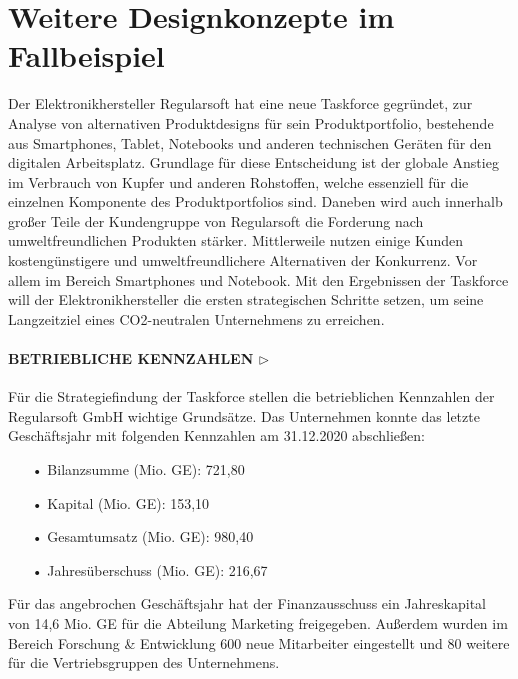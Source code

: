 \documentclass[12pt,titlepage]{article}
\begin{document}
\section*{Weitere Designkonzepte im Fallbeispiel} 
Der Elektronikhersteller Regularsoft hat eine neue Taskforce gegründet, zur Analyse von alternativen Produktdesigns für sein Produktportfolio, bestehende aus Smartphones, Tablet, Notebooks und anderen technischen Geräten für den digitalen Arbeitsplatz. Grundlage für diese Entscheidung ist der globale Anstieg im Verbrauch von Kupfer und anderen Rohstoffen, welche essenziell für die einzelnen Komponente des Produktportfolios sind. Daneben wird auch innerhalb großer Teile der Kundengruppe von Regularsoft die Forderung nach umweltfreundlichen Produkten stärker. Mittlerweile nutzen einige Kunden kostengünstigere und umweltfreundlichere Alternativen der Konkurrenz. Vor allem im Bereich Smartphones und Notebook.
Mit den Ergebnissen der Taskforce will der Elektronikhersteller die ersten strategischen Schritte setzen, um seine Langzeitziel eines CO2-neutralen Unternehmens zu erreichen.


\paragraph{\textbf{BETRIEBLICHE KENNZAHLEN $\triangleright$}}
Für die Strategiefindung der Taskforce stellen die betrieblichen Kennzahlen der Regularsoft GmbH wichtige Grundsätze. Das Unternehmen konnte das letzte Geschäftsjahr mit folgenden Kennzahlen am 31.12.2020 abschließen:
\begin{itemize}
\item[•] Bilanzsumme (Mio. GE):		721,80
\item[•] Kapital (Mio. GE):			153,10
\item[•] Gesamtumsatz (Mio. GE):	980,40
\item[•] Jahresüberschuss (Mio. GE):	216,67
\end{itemize}
Für das angebrochen Geschäftsjahr hat der Finanzausschuss ein Jahreskapital von 14,6  Mio. GE für die Abteilung Marketing freigegeben. Außerdem wurden im Bereich Forschung \& Entwicklung 600 neue Mitarbeiter eingestellt und 80 weitere für die Vertriebsgruppen des Unternehmens.
\end{document}
